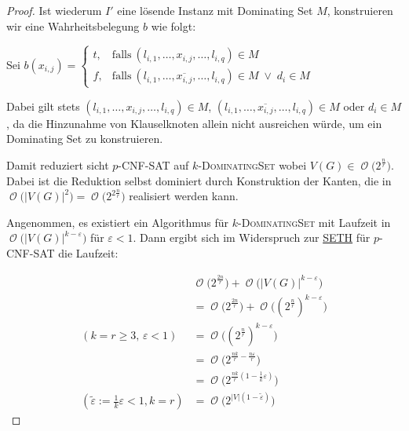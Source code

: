 \documentclass[a4paper,ngerman]{atseminar}
\newcommand{\BigO}[1]{\ensuremath{\operatorname{\mathcal{O}}\bigl(#1\bigr)}\xspace}
\begin{document}
\begin{proof}
  \noindent
  Ist wiederum $I'$ eine lösende Instanz mit Dominating Set $M$, konstruieren wir eine Wahrheitsbelegung $b$ wie folgt:

  \vspace{0.25cm}
  Sei $b(x_{i,j}) = \begin{cases}
    t, & \text{falls}\ (l_{i,1}, \dots, x_{i,j}, \dots, l_{i,q}) \in M \\
    f, & \text{falls}\ (l_{i,1}, \dots, \overline{x_{i,j}}, \dots, l_{i,q}) \in M \; \lor \; d_i \in M
  \end{cases}$
  \vspace{0.25cm}

  \noindent
  Dabei gilt stets $(l_{i,1}, \dots, x_{i,j}, \dots, l_{i,q}) \in M$,  $(l_{i,1}, \dots, \overline{x_{i,j}}, \dots, l_{i,q}) \in M$ oder $d_i \in M$, da die
  Hinzunahme von Klauselknoten allein nicht ausreichen würde, um ein Dominating Set zu konstruieren.

  \noindent
  Damit reduziert sicht $p$-\textsc{CNF-SAT} auf $k$-\textsc{DominatingSet} wobei $V(G) \in \BigO{2^{\frac{n}{r}}}$.
  Dabei ist die Reduktion selbst dominiert durch Konstruktion der Kanten, die in $\BigO{|V(G)|^2} = \BigO{2^{2\frac{n}{r}}}$ realisiert werden kann. 

  \vspace{0.25cm}
  \noindent
  Angenommen, es existiert ein Algorithmus für $k$-\textsc{DominatingSet} mit Laufzeit in \BigO{|V(G)|^{k - \varepsilon}} für $\varepsilon < 1$.
  Dann ergibt sich im Widerspruch zur \hyperref[oe:definition:seth]{SETH} für $p$-\textsc{CNF-SAT} die Laufzeit:
  
  \begin{equation*}
    \begin{split}
     &  \BigO{2^{\frac{2n}{r}}} + \BigO{|V(G)|^{k - \varepsilon}} \\
     & = \BigO{2^{\frac{2n}{r}}} + \BigO{(2^{\frac{n}{r}})^{k - \varepsilon}} \\
    (k = r \geq 3,\,  \varepsilon < 1) &  = \BigO{(2^{\frac{n}{r}})^{k - \varepsilon}} \\ 
    & = \BigO{2^{\frac{nk}{r} - \frac{n\varepsilon}{r}}} \\
    &  = \BigO{2^{\frac{nk}{r} (1 - \frac{1}{k}\varepsilon)}} \\
    (\tilde{\varepsilon} := \frac{1}{k}\varepsilon < 1, k = r)  & = \BigO{2^{|V| (1 - \tilde{\varepsilon})}}
    \end{split}  
  \end{equation*}
\end{proof}
\end{document}
